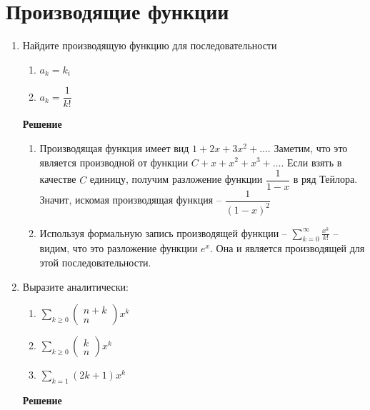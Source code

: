 \documentclass[12pt]{article}
\begin{document}
	\section{Производящие функции}
	\begin{enumerate}[label={\textbf{\arabic{section}.\arabic*}}]
		\item Найдите производящую функцию для последовательности
		\begin{enumerate}[label=\textbf{\alph*)}]
			\item $a_k = k_i$
			\item $a_k = \dfrac{1}{k!}$
		\end{enumerate}
	
		\textbf{Решение}
		
		\begin{enumerate}[label=\textbf{\alph*)}]
			\item Производящая функция имеет вид $1 + 2x + 3x^2 + \dots$. Заметим, что это является производной от функции $C + x + x^2 + x^3 + \dots$. Если взять в качестве $C$ единицу, получим разложение функции $\dfrac{1}{1-x}$ в ряд Тейлора. Значит, искомая производящая функция -- $\dfrac{1}{(1-x)^2}$
			\item Используя формальную запись производящей функции -- $\sum\limits_{k=0}^\infty \frac{x^k}{k!}$ -- видим, что это разложение функции $e^x$. Она и является производящей для этой последовательности.
		\end{enumerate}
	
		\item Выразите аналитически:
		\begin{enumerate}[label=\textbf{\alph*)}]
			\item $\sum\limits_{k\geqslant0}
			\begin{pmatrix}
				n + k \\
				n
			\end{pmatrix} x^k$
			\item $\sum\limits_{k\geqslant0}
			\begin{pmatrix}
				k \\
				n
			\end{pmatrix} x^k$
			\item $\sum\limits_{k=1} (2k+1)x^k$
		\end{enumerate}
	
		\textbf{Решение}
		

\end{enumerate}
\end{document}
